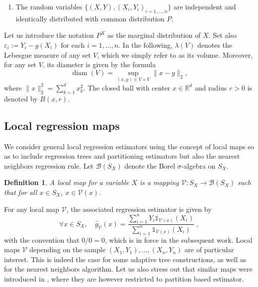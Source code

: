 \documentclass[paper=a4, fontsize=11pt]{scrartcl}
\newcommand{\diam}{\operatorname{diam}}
\newtheorem{definition}[theorem]{Definition}
\begin{document}
\begin{enumerate}[label=(D), wide=0.5em,  leftmargin=*]
\item \label{cond:D} 
The random variables $\{(X,Y), (X_i,Y_i)_ {i=1,\ldots,n} \}$ are independent and identically distributed with common distribution $  P$. 
\end{enumerate}
Let us introduce the notation $P^X$ as the marginal distribution of $X$. Set also $\varepsilon_ i := Y_i - g(X_i) $ for each $i=1,\ldots, n$. 
In the following, $\lambda(V)$ denotes the Lebesgue measure of any set $V$, which we simply refer to as its volume. Moreover, for any set $V$, its diameter is given by the formula
$$ \diam (V)  = \sup_{(x,y)\in V\times V} \|x-y\|_2,$$
where $\|x\|_2^2 = \sum_{k=1} ^d x_k^2$. %
The closed ball with center $x\in \mathbb R^d$ and radius $r>0$ is denoted by $B(x,r)$.

\subsection{Local regression maps}\label{s22}

We consider general local regression estimators using the concept of local maps so as to include regression trees and partitioning estimators but also the nearest neighbors regression rule. Let $\mathcal B(S_X)$ denote the Borel $\sigma$-algebra on $S_X$.

\begin{definition}
    A local map for a variable $X$ is a mapping $ \mathcal V : S_X \to \mathcal B(S_X) $ such that for all $x\in S_X$, $x\in \mathcal V (x)$. 
\end{definition}

For any local map $\mathcal V$, the associated regression estimator is given by
\begin{equation*}
    \forall x \in S_X, \quad \hat g_{\mathcal V}(x) = \frac{\sum_{i=1} ^ n Y_i\mathds 1 _{ \mathcal V(x) }(X_i) }{\sum_{i=1} ^ n \mathds 1 _{ \mathcal V(x) }(X_i)  }\; , 
\end{equation*}
with the convention that $0/0 = 0$, which is in force in the subsequent work. %
Local maps  $\mathcal V $ depending on the sample $(X_1,Y_1),\ldots , (X_n, Y_n)$ are of particular interest. This is indeed the case for some adaptive tree constructions, as well as for the nearest neighbors algorithm. Let us also stress out that similar maps were introduced in \cite{nobel}, where they are however restricted to partition based estimator.  %
\end{document}
